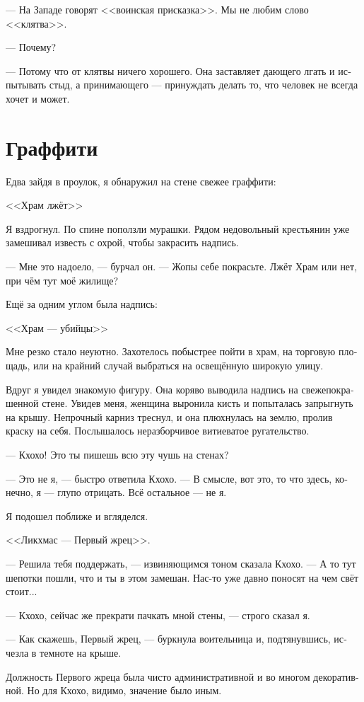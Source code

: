 \documentclass[a4paper,12pt,fleqn]{book}\usepackage{polyglossia}\setdefaultlanguage[babelshorthands=true]{russian}\setotherlanguage{english}\defaultfontfeatures{Ligatures=TeX,Mapping=tex-text}\usepackage{xcolor}\newcommand{\ml}[3]{#2}
\begin{document}
{--- На Западе говорят <<воинская присказка>>.
Мы не любим слово <<клятва>>.

--- Почему?

--- Потому что от клятвы ничего хорошего.
Она заставляет дающего лгать и испытывать стыд, а принимающего --- принуждать делать то, что человек не всегда хочет и может.

\section{Граффити}

Едва зайдя в проулок, я обнаружил на стене свежее граффити:

<<Храм лжёт>>

Я вздрогнул.
По спине поползли мурашки.
Рядом недовольный крестьянин уже замешивал известь с охрой, чтобы закрасить надпись.

--- Мне это надоело, --- бурчал он.
--- Жопы себе покрасьте.
Лжёт Храм или нет, при чём тут моё жилище?

Ещё за одним углом была надпись:

<<Храм --- убийцы>>

Мне резко стало неуютно.
Захотелось побыстрее пойти в храм, на торговую площадь, или на крайний случай выбраться на освещённую широкую улицу.

Вдруг я увидел знакомую фигуру.
Она коряво выводила надпись на свежепокрашенной стене.
Увидев меня, женщина выронила кисть и попыталась запрыгнуть на крышу.
Непрочный карниз треснул, и она плюхнулась на землю, пролив краску на себя.
Послышалось неразборчивое витиеватое ругательство.

--- Кхохо!
Это ты пишешь всю эту чушь на стенах?

--- Это не я, --- быстро ответила Кхохо.
--- В смысле, вот это, то что здесь, конечно, я --- глупо отрицать.
Всё остальное --- не я.

Я подошел поближе и вгляделся.

<<Ликхмас --- Первый жрец>>.

--- Решила тебя поддержать, --- извиняющимся тоном сказала Кхохо.
--- А то тут шепотки пошли, что и ты в этом замешан.
Нас-то уже давно поносят на чем свёт стоит...

--- Кхохо, сейчас же прекрати пачкать мной стены, --- строго сказал я.

--- Как скажешь, Первый жрец, --- буркнула воительница и, подтянувшись, исчезла в темноте на крыше.

Должность Первого жреца была чисто административной и во многом декоративной.
Но для Кхохо, видимо, значение было иным.

}
\end{document}

